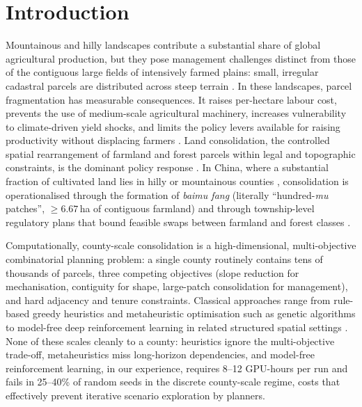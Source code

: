 \documentclass[11pt]{article}
\begin{document}
\section{Introduction}\label{sec:intro}

Mountainous and hilly landscapes contribute a substantial share of global agricultural production, but they pose management challenges distinct from those of the contiguous large fields of intensively farmed plains: small, irregular cadastral parcels are distributed across steep terrain \citep{romeo2020fao,liu2023fragmentation,foley2011solutions}. In these landscapes, parcel fragmentation has measurable consequences. It raises per-hectare labour cost, prevents the use of medium-scale agricultural machinery, increases vulnerability to climate-driven yield shocks, and limits the policy levers available for raising productivity without displacing farmers \citep{niu2023fragmentation,yu2020consolidation,springmann2018options,lambin2011global}. Land consolidation, the controlled spatial rearrangement of farmland and forest parcels within legal and topographic constraints, is the dominant policy response \citep{liu2014land,long2014rural,rounsevell2014challenges}. In China, where a substantial fraction of cultivated land lies in hilly or mountainous counties \citep{huang2018evaluation}, consolidation is operationalised through the formation of \textit{baimu fang} (literally ``hundred-\textit{mu} patches'', $\geq 6.67$\,ha of contiguous farmland) and through township-level regulatory plans that bound feasible swaps between farmland and forest classes \citep{liu2023fragmentation,rockstroem2009safe}.

Computationally, county-scale consolidation is a high-dimensional, multi-objective combinatorial planning problem: a single county routinely contains tens of thousands of parcels, three competing objectives (slope reduction for mechanisation, contiguity for shape, large-patch consolidation for management), and hard adjacency and tenure constraints. Classical approaches range from rule-based greedy heuristics and metaheuristic optimisation such as genetic algorithms \citep{cao2012boundary,deb2002fast,stewart2004multi,aerts2002using,caoStewart2011integrated,ligmann2008integrating} to model-free deep reinforcement learning in related structured spatial settings \citep{zheng2023urban,equihua2024connectivity,janowicz2020geoai,sun2020optimal,verburg2008combined}. None of these scales cleanly to a county: heuristics ignore the multi-objective trade-off, metaheuristics miss long-horizon dependencies, and model-free reinforcement learning, in our experience, requires 8--12 GPU-hours per run and fails in 25--40\% of random seeds in the discrete county-scale regime, costs that effectively prevent iterative scenario exploration by planners.
\end{document}
